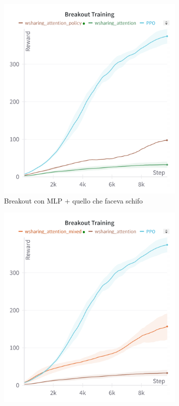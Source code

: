\begin{figure}[htbp]
    \centering
    \begin{subfigure}[b]{0.32\textwidth}
        \centering
        \includegraphics[width=\textwidth]{images/breakout_policy.png}
        \caption{Breakout con MLP + quello che faceva schifo}
        \label{fig:breakout_expert}
    \end{subfigure}
    \hfill
    \begin{subfigure}[b]{0.32\textwidth}
        \centering
        \includegraphics[width=\textwidth]{images/breakout_expert.png}

\end{subfigure}
\end{figure}
